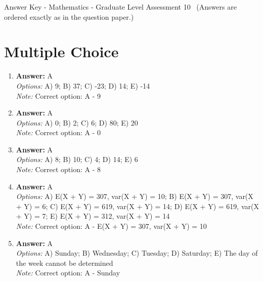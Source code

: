 \documentclass[12pt]{article}
\begin{document}
\begin{center}
Answer Key - Mathematics - Graduate Level Assessment 10 \
\small (Answers are ordered exactly as in the question paper.)
\end{center}

\section*{Multiple Choice}
\begin{enumerate}[label=\arabic*.]
\item \textbf{Answer:} A
\\ \textit{Options:} A) 9; B) 37; C) -23; D) 14; E) -14
\\ \textit{Note:} Correct option: A - 9
\item \textbf{Answer:} A
\\ \textit{Options:} A) 0; B) 2; C) 6; D) 80; E) 20
\\ \textit{Note:} Correct option: A - 0
\item \textbf{Answer:} A
\\ \textit{Options:} A) 8; B) 10; C) 4; D) 14; E) 6
\\ \textit{Note:} Correct option: A - 8
\item \textbf{Answer:} A
\\ \textit{Options:} A) E(X + Y) = 307, var(X + Y) = 10; B) E(X + Y) = 307, var(X + Y) = 6; C) E(X + Y) = 619, var(X + Y) = 14; D) E(X + Y) = 619, var(X + Y) = 7; E) E(X + Y) = 312, var(X + Y) = 14
\\ \textit{Note:} Correct option: A - E(X + Y) = 307, var(X + Y) = 10
\item \textbf{Answer:} A
\\ \textit{Options:} A) Sunday; B) Wednesday; C) Tuesday; D) Saturday; E) The day of the week cannot be determined
\\ \textit{Note:} Correct option: A - Sunday
\end{enumerate}
\end{document}
